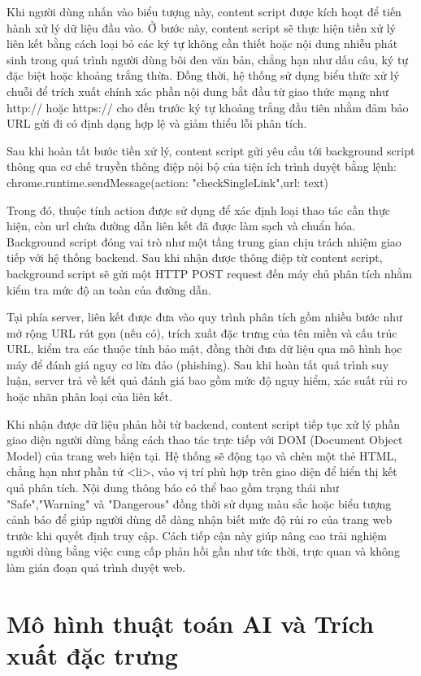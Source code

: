 Khi người dùng nhấn vào biểu tượng này, content script được kích hoạt để tiến hành xử lý dữ liệu đầu vào. Ở bước này, content script sẽ thực hiện tiền xử lý liên kết bằng cách loại bỏ các ký tự không cần thiết hoặc nội dung nhiễu phát sinh trong quá trình người dùng bôi đen văn bản, chẳng hạn như dấu câu, ký tự đặc biệt hoặc khoảng trắng thừa. Đồng thời, hệ thống sử dụng biểu thức xử lý chuỗi để trích xuất chính xác phần nội dung bắt đầu từ giao thức mạng như http:// hoặc https:// cho đến trước ký tự khoảng trắng đầu tiên nhằm đảm bảo URL gửi đi có định dạng hợp lệ và giảm thiểu lỗi phân tích.

Sau khi hoàn tất bước tiền xử lý, content script gửi yêu cầu tới background script thông qua cơ chế truyền thông điệp nội bộ của tiện ích trình duyệt bằng lệnh:
chrome.runtime.sendMessage({action: "checkSingleLink",url: text})

Trong đó, thuộc tính action được sử dụng để xác định loại thao tác cần thực hiện, còn url chứa đường dẫn liên kết đã được làm sạch và chuẩn hóa. Background script đóng vai trò như một tầng trung gian chịu trách nhiệm giao tiếp với hệ thống backend. Sau khi nhận được thông điệp từ content script, background script sẽ gửi một HTTP POST request đến máy chủ phân tích nhằm kiểm tra mức độ an toàn của đường dẫn.

Tại phía server, liên kết được đưa vào quy trình phân tích gồm nhiều bước như mở rộng URL rút gọn (nếu có), trích xuất đặc trưng của tên miền và cấu trúc URL, kiểm tra các thuộc tính bảo mật, đồng thời đưa dữ liệu qua mô hình học máy để đánh giá nguy cơ lừa đảo (phishing). Sau khi hoàn tất quá trình suy luận, server trả về kết quả đánh giá bao gồm mức độ nguy hiểm, xác suất rủi ro hoặc nhãn phân loại của liên kết.

Khi nhận được dữ liệu phản hồi từ backend, content script tiếp tục xử lý phần giao diện người dùng bằng cách thao tác trực tiếp với DOM (Document Object Model) của trang web hiện tại. Hệ thống sẽ động tạo và chèn một thẻ HTML, chẳng hạn như phần tử <li>, vào vị trí phù hợp trên giao diện để hiển thị kết quả phân tích. Nội dung thông báo có thể bao gồm trạng thái như "Safe","Warning" và "Dangerous" đồng thời sử dụng màu sắc hoặc biểu tượng cảnh báo để giúp người dùng dễ dàng nhận biết mức độ rủi ro của trang web trước khi quyết định truy cập. Cách tiếp cận này giúp nâng cao trải nghiệm người dùng bằng việc cung cấp phản hồi gần như tức thời, trực quan và không làm gián đoạn quá trình duyệt web.


\section{Mô hình thuật toán AI và Trích xuất đặc trưng}
\label{sec:mo-hinh-ai-chi-tiet}

